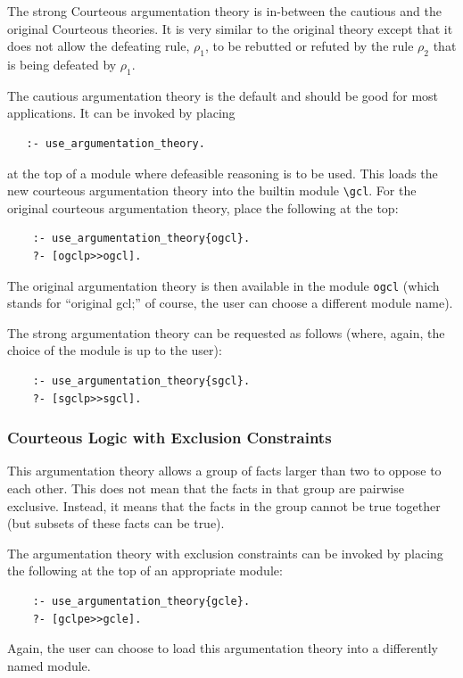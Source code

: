 \documentclass[11pt]{article}
\newcommand{\ERGO}{\mbox{\smaller{\ensuremath{\cal{E}}\smaller{{\sc{RGO}}}}}\xspace}
\newcommand{\FLSYSTEM}{\ERGO}
\newcommand{\bs}{\textbackslash}
\begin{document}
The strong Courteous argumentation theory is in-between the cautious and
the original Courteous theories. It is very similar to the original theory except that it
does not allow the defeating rule, $\rho_1$, to be rebutted or refuted by the 
rule $\rho_2$ that is being defeated by $\rho_1$.

The cautious argumentation theory is the default and should be good for most
  applications. It can be invoked by placing
\begin{verbatim}
   :- use_argumentation_theory.
\end{verbatim}
  at the top of a \FLSYSTEM module where defeasible reasoning is to be
  used.  This loads the new courteous argumentation theory into the builtin
  module {\tt \bs{}gcl}. For the original courteous argumentation theory,
  place the following at the top:
\begin{verbatim}
    :- use_argumentation_theory{ogcl}.
    ?- [ogclp>>ogcl].
\end{verbatim}
The original argumentation theory is then available in the module {\tt ogcl}
(which stands for ``original gcl;'' of course, the user can choose a different module name).

The strong argumentation theory can be requested as follows (where, again,
the choice of the module is up to the user):
\begin{verbatim}
    :- use_argumentation_theory{sgcl}.
    ?- [sgclp>>sgcl].
\end{verbatim}

\subsubsection{Courteous Logic with Exclusion Constraints}

This argumentation theory
allows a group of facts larger than two to oppose to each other. This does
not mean that the facts in that group are pairwise exclusive. Instead, it
means that the facts in the group cannot be true together (but subsets of
these facts can be true).

The argumentation theory with exclusion constraints
can be invoked by placing the following at the
top of an appropriate module:
\begin{verbatim}
    :- use_argumentation_theory{gcle}.
    ?- [gclpe>>gcle].
\end{verbatim}
Again, the user can choose to load this argumentation theory into a
differently named module.
\end{document}
